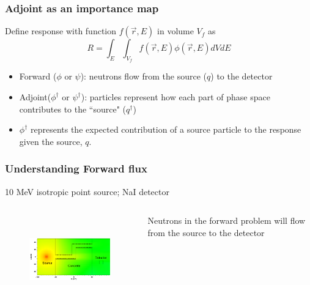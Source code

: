 \documentclass[xcolor=x11names,compress,handout]{beamer}
\renewcommand{\(}{\begin{columns}}
\renewcommand{\)}{\end{columns}}
\newcommand{\<}[1]{\begin{column}{#1}}
\renewcommand{\>}{\end{column}}
\newcommand{\ve}[1]{\ensuremath{\vec{#1}}}
\begin{document}
\begin{frame}[fragile]
  \frametitle{Adjoint as an importance map}
Define response with function $f(\ve{r}, E)$ in volume $V_f$ as
%
\begin{equation}
 R = \int_E \int_{V_f} f(\ve{r}, E) \phi(\ve{r}, E) dV dE 
 \label{eq:Response}
\end{equation}
\pause
\begin{itemize}
\item Forward ($\phi$ or $\psi$): neutrons flow from the source ($q$) to the detector
\item Adjoint($\phi^{\dagger}$ or $\psi^{\dagger}$): particles represent how each part of phase space contributes to the ``source" ($q^{\dagger}$)
\item $\phi^{\dagger}$ represents the expected contribution of a source particle to the response given the source, $q$.
\end{itemize}


\end{frame}
\begin{frame}[fragile]

  \frametitle{Understanding Forward flux}
  10 MeV isotropic point source; NaI detector
  \begin{columns}
   \begin{column}{0.75\textwidth}
   \begin{figure}
   \includegraphics[height=1.5in,clip]{../figs/maze-forward.png}
   \end{figure}
   \end{column}
  \begin{column}{0.25\textwidth}
Neutrons in the forward problem will flow from the source to the detector
   \end{column}
\end{columns}
	
\end{frame}
\end{document}
